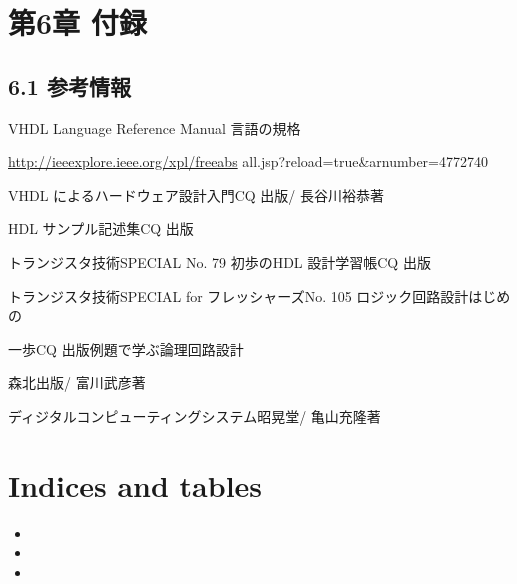 \documentclass[letterpaper,10pt,dvipdfmx]{sphinxmanual}
\begin{document}
\chapter{第6章 付録}
\label{06_appendix::doc}\label{06_appendix:id1}

\section{6.1 参考情報}
\label{06_appendix:id2}
VHDL Language Reference Manual 言語の規格

\href{http://ieeexplore.ieee.org/xpl/freeabs}{http://ieeexplore.ieee.org/xpl/freeabs} all.jsp?reload=true\&arnumber=4772740

VHDL によるハードウェア設計入門CQ 出版/ 長谷川裕恭著

HDL サンプル記述集CQ 出版

トランジスタ技術SPECIAL No. 79 初歩のHDL 設計学習帳CQ 出版

トランジスタ技術SPECIAL for フレッシャーズNo. 105 ロジック回路設計はじめの

一歩CQ 出版例題で学ぶ論理回路設計

森北出版/ 富川武彦著

ディジタルコンピューティングシステム昭晃堂/ 亀山充隆著


\chapter{Indices and tables}
\label{index:indices-and-tables}\begin{itemize}
\item {} 

\item {} 

\item {} 

\end{itemize}



\renewcommand{\indexname}{索引}
\printindex
\end{document}
